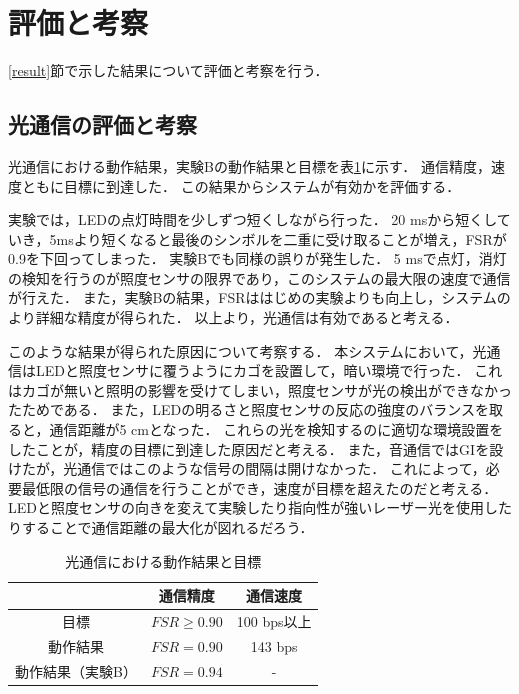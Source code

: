 \section{評価と考察}
\label{evaluation}
\ref{result}節で示した結果について評価と考察を行う．
\subsection{光通信の評価と考察}
光通信における動作結果，実験Bの動作結果と目標を表\ref{table:light}に示す．
通信精度，速度ともに目標に到達した．
この結果からシステムが有効かを評価する．
\par
実験では，LEDの点灯時間を少しずつ短くしながら行った．
20 msから短くしていき，5msより短くなると最後のシンボルを二重に受け取ることが増え，FSRが0.9を下回ってしまった．
実験Bでも同様の誤りが発生した．
5 msで点灯，消灯の検知を行うのが照度センサの限界であり，このシステムの最大限の速度で通信が行えた．
また，実験Bの結果，FSRははじめの実験よりも向上し，システムのより詳細な精度が得られた．
以上より，光通信は有効であると考える．

\par
このような結果が得られた原因について考察する．
本システムにおいて，光通信はLEDと照度センサに覆うようにカゴを設置して，暗い環境で行った．
これはカゴが無いと照明の影響を受けてしまい，照度センサが光の検出ができなかったためである．
また，LEDの明るさと照度センサの反応の強度のバランスを取ると，通信距離が5 cmとなった．
これらの光を検知するのに適切な環境設置をしたことが，精度の目標に到達した原因だと考える．
また，音通信ではGIを設けたが，光通信ではこのような信号の間隔は開けなかった．
これによって，必要最低限の信号の通信を行うことができ，速度が目標を超えたのだと考える．
LEDと照度センサの向きを変えて実験したり指向性が強いレーザー光を使用したりすることで通信距離の最大化が図れるだろう．


\begin{table}[tb]
    \centering
    \caption{光通信における動作結果と目標}
    \label{table:light}
    \begin{tabular}{|c|c|c|} \hline
            &通信精度  &通信速度  \\ \hline
        目標 & $FSR \geq 0.90$ &100 bps以上 \\ \hline
        動作結果 &$FSR = 0.90$ &143 bps  \\ \hline
        動作結果（実験B） &$FSR = 0.94$ &- \\ \hline
    \end{tabular}
\end{table}

